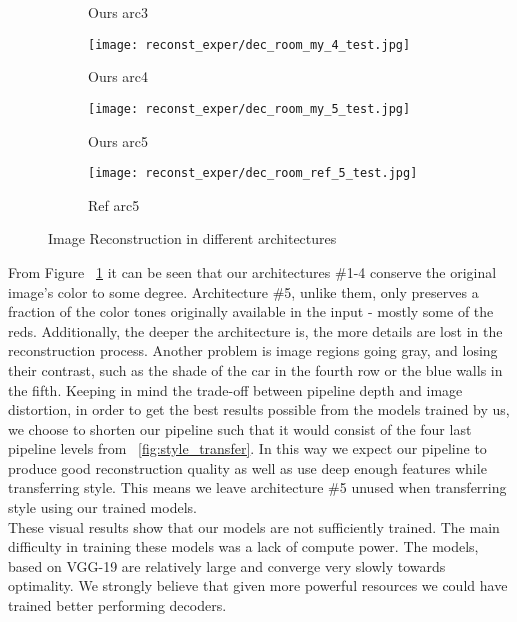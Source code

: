 \begin{figure}[H]
\begin{subfigure}[b]{0.13\linewidth}
		\caption{Ours arc3}
	\end{subfigure}
	\begin{subfigure}[b]{0.13\linewidth}
		\texttt{[image: reconst\_exper/dec\_room\_my\_4\_test.jpg]} %
		\caption{Ours arc4}
	\end{subfigure}
	\begin{subfigure}[b]{0.13\linewidth}
		\texttt{[image: reconst\_exper/dec\_room\_my\_5\_test.jpg]} %
		\caption{Ours arc5}
	\end{subfigure}
	\begin{subfigure}[b]{0.13\linewidth}
		\texttt{[image: reconst\_exper/dec\_room\_ref\_5\_test.jpg]} %
		\caption{Ref arc5}	
	\end{subfigure}
	\caption{Image Reconstruction in different architectures}
	\label{fig:reconstruction}
\end{figure}

From Figure ~\ref{fig:reconstruction} it can be seen that our architectures \#1-4 conserve the original image's color to some degree. Architecture \#5, unlike them, only preserves a fraction of the color tones originally available in the input - mostly some of the reds. Additionally, the deeper the architecture is, the more details are lost in the reconstruction process. Another problem is image regions going gray, and losing their contrast, such as the shade of the car in the fourth row or the blue walls in the fifth. Keeping in mind the trade-off between pipeline depth and image distortion, in order to get the best results possible from the models trained by us, we choose to shorten our pipeline such that it would consist of the four last pipeline levels from ~\ref{fig:style_transfer}. In this way we expect our pipeline to produce good reconstruction quality as well as use deep enough features while transferring style. This means we leave architecture \#5 unused when transferring style using our trained models.\\
These visual results show that our models are not sufficiently trained. The main difficulty in training these models was a lack of compute power. The models, based on VGG-19 are relatively large and converge very slowly towards optimality. We strongly believe that given more powerful resources we could have trained better performing decoders.\\
  

